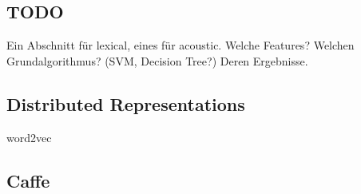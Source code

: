 
\subsection{TODO}
Ein Abschnitt für lexical, eines für acoustic.
Welche Features?
Welchen Grundalgorithmus? (SVM, Decision Tree?)
Deren Ergebnisse.

\subsection{Distributed Representations}
word2vec
\subsection{Caffe}
